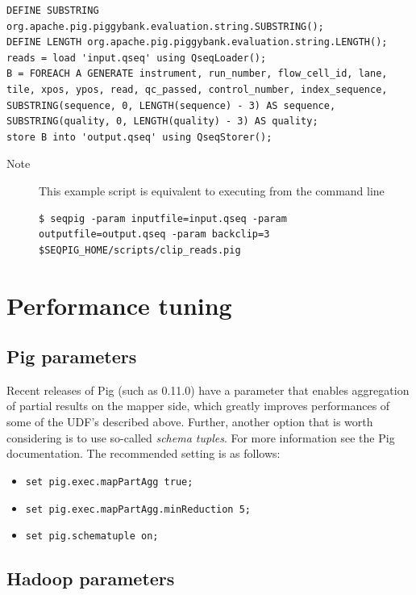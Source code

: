{\begin{lstlisting}
DEFINE SUBSTRING org.apache.pig.piggybank.evaluation.string.SUBSTRING();
DEFINE LENGTH org.apache.pig.piggybank.evaluation.string.LENGTH();
reads = load 'input.qseq' using QseqLoader();
B = FOREACH A GENERATE instrument, run_number, flow_cell_id, lane, tile, xpos, ypos, read, qc_passed, control_number, index_sequence, SUBSTRING(sequence, 0, LENGTH(sequence) - 3) AS sequence, SUBSTRING(quality, 0, LENGTH(quality) - 3) AS quality;
store B into 'output.qseq' using QseqStorer();
\end{lstlisting}
\begin{description}
	\item[Note] This example script is equivalent to executing from the command line
\begin{lstlisting}
$ seqpig -param inputfile=input.qseq -param outputfile=output.qseq -param backclip=3 $SEQPIG_HOME/scripts/clip_reads.pig
\end{lstlisting}
\end{description}

\section{Performance tuning}

\subsection{Pig parameters}

Recent releases of Pig (such as 0.11.0) have a parameter that enables
aggregation of partial results on the mapper side, which greatly
improves performances of some of the UDF's described above. Further,
another option that is worth considering is to use so-called
\emph{schema tuples}. For more information see the Pig
documentation. The recommended setting is as follows:
\begin{itemize}
\item {\tt set pig.exec.mapPartAgg true;}
\item {\tt set pig.exec.mapPartAgg.minReduction 5;}
\item {\tt set pig.schematuple on;}
\end{itemize}

\subsection{Hadoop parameters}

}
